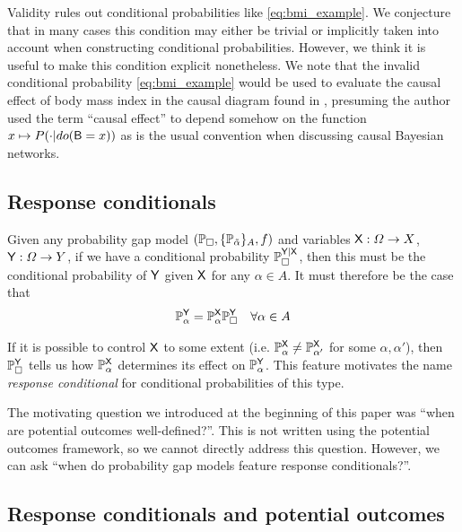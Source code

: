 Validity rules out conditional probabilities like \ref{eq:bmi_example}. We conjecture that in many cases this condition may either be trivial or implicitly taken into account when constructing conditional probabilities. However, we think it is useful to make this condition explicit nonetheless. We note that the invalid conditional probability \ref{eq:bmi_example} would be used to evaluate the causal effect of body mass index in the causal diagram found in \citet{shahar_association_2009}, presuming the author used the term ``causal effect'' to depend somehow on the function $x\mapsto P(\cdot|do(\mathsf{B}=x))$ as is the usual convention when discussing causal Bayesian networks.


\subsection{Response conditionals}

Given any probability gap model $(\mathbb{P}_\square,\{\mathbb{P}_{\tilde{\alpha}}\}_A,f)$ and variables $\mathsf{X}:\Omega\to X$, $\mathsf{Y}:\Omega\to Y$, if we have a conditional probability $\mathbb{P}_\square^{\mathsf{Y}|\mathsf{X}}$, then this must be the conditional probability of $\mathsf{Y}$ given $\mathsf{X}$ for any $\alpha\in A$. It must therefore be the case that
\begin{align}
    \mathbb{P}_\alpha^{\mathsf{Y}} &= \mathbb{P}_\alpha^{\mathsf{X}}\mathbb{P}_\square^{\mathsf{Y}}&\forall \alpha\in A
\end{align}

If it is possible to control $\mathsf{X}$ to some extent (i.e. $\mathbb{P}_\alpha^{\mathsf{X}}\neq\mathbb{P}_{\alpha'}^{\mathsf{X}}$ for some $\alpha,\alpha'$), then $\mathbb{P}_\square^{\mathsf{Y}}$ tells us how $\mathbb{P}_\alpha^{\mathsf{X}}$ determines its effect on $\mathbb{P}_\alpha^{\mathsf{Y}}$. This feature motivates the name \emph{response conditional} for conditional probabilities of this type.

The motivating question we introduced at the beginning of this paper was ``when are potential outcomes well-defined?''. This is not written using the potential outcomes framework, so we cannot directly address this question. However, we can ask ``when do probability gap models feature response conditionals?''.

\subsection{Response conditionals and potential outcomes}\label{sec:curry}


